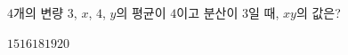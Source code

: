 $4$개의 변량 $3$, $x$, $4$, $y$의 평균이 $4$이고 분산이 $3$일 때, $xy$의 값은?
\begin{choices32}{$15$}{$16$}{$18$}{$19$}{$20$}\end{choices32}
